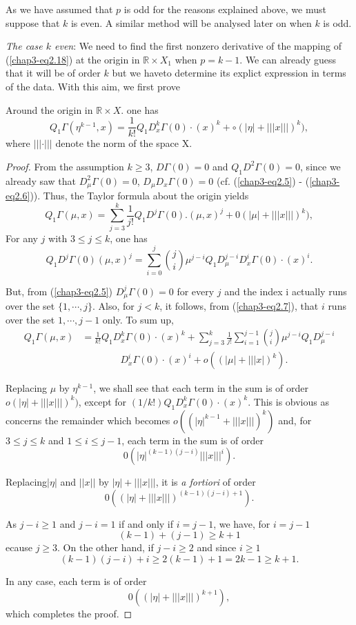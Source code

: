 As we have assumed that $p$ is odd for the reasons explained above, we
must suppose that $k$ is even. A similar method will be analysed later
on when $k$ is odd.

{\em The case $k$ even}: We need to find the first nonzero derivative of
the mapping of (\ref{chap3-eq2.18}) at the origin in $\mathbb{R}
\times X_{1}$ when $p = k - 1$. We can already guess that it will be of
order $k$ but we have\pageoriginale to determine its explict expression
in terms of the data. With this aim, we first prove
\begin{lemma}\label{chap3-lem2.1}
Around the origin in $\mathbb{R} \times X$. one has
$$
Q_{1}\Gamma(\eta^{k-1}, x) = \frac{1}{k!} Q_{1}D_{x}^{k}\Gamma(0)
\cdot (x)^{k} + \circ (|\eta| + |||x|||)^{k}),
$$
where $|||\cdot|||$ denote the norm of the space X.
\end{lemma}

\begin{proof}
From the assumption $k \geq 3$, $D\Gamma(0) = 0$ and
$Q_{1}D^{2}\Gamma(0) = 0$, since we already saw that
$D_{\mu}^{2}\Gamma(0) = 0$, $D_{\mu}D_{x}\Gamma(0) = 0$
(cf. (\ref{chap3-eq2.5}) - (\ref{chap3-eq2.6})). Thus, the Taylor
formula about the origin yields
$$
Q_{1}\Gamma(\mu, x) = \sum\limits_{j=3}^{k} \frac{1}{j!}
Q_{1}D^{j}\Gamma(0).(\mu, x)^{j} + 0 (|\mu| + |||x|||)^{k}),
$$
For any $j$ with $3 \leq j \leq k$, one has
$$
Q_{1}D^{j}\Gamma(0)(\mu, x)^{j} = \sum\limits_{i=0}^{j} \binom{j}{i} 
\mu^{j-i} Q_{1}D_{\mu}^{j-i} D_{x}^{i} \Gamma(0) \cdot (x)^{i}.
$$

But, from (\ref{chap3-eq2.5}) $D_{\mu}^{j}\Gamma(0) = 0$ for every $j$
and the index i actually runs over the set $\{1, \cdots, j\}$. Also,
for $j < k$, it follows, from (\ref{chap3-eq2.7}), that $i$ runs over
the set $1, \cdots, j-1$ only. To sum up,
\begin{align*}
Q_{1}\Gamma(\mu, x) &= \frac{1}{k!} Q_{1}D_{x}^{k}\Gamma(0) \cdot
(x)^{k} + \sum\limits_{j=3}^{k} \frac{1}{j!} \sum\limits_{i=1}^{j-1}
(_{i}^{j}) \mu^{j-i} Q_{1}D_{\mu}^{j-i}\\
&\qquad\qquad D_{x}^{i}\Gamma(0) \cdot (x)^{i} + o ((|\mu| + |||x|)^{k}).
\end{align*}

Replacing $\mu$ by $\eta^{k-1}$, we shall see that each term in the
sum is of order $o(|\eta| + |||x|||)^{k})$, except for $(1/k!)
Q_{1}D_{x}^{k}\Gamma(0) \cdot (x)^{k}$. This is obvious as concerns
the remainder which becomes $o ((|\eta|^{k-1} + |||x|||)^{k})$ and, for
$3 \leq j \leq k$ and $1 \leq i \leq j - 1$, each term in the sum is
of order
$$
0(|\eta|^{(k-1)(j-i)} |||x|||^{i}).
$$

Replacing\pageoriginale $|\eta|$ and $||x||$ by $|\eta| + |||x|||$, it
is {\em a fortiori} of order
$$
0 ((|\eta| + |||x|||)^{(k-1)(j-i)+1}).
$$

As $j - i \geq 1$ and $j - i = 1$ if and only if $i = j - 1$, we have,
for $i = j - 1$
$$
(k-1) + (j-1) \geq k+1
$$
ecause $j \geq 3$. On the other hand, if $j-i \geq 2$ and since $i
\geq 1$
$$
(k-1)(j-i) + i \geq 2(k-1) + 1 = 2k - 1 \geq k + 1.
$$

In any case, each term is of order
$$
0((|\eta| + |||x|||)^{k+1}),
$$
which completes the proof.
\end{proof}

